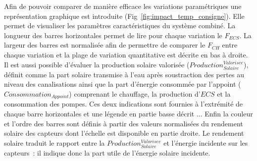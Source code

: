 Afin de pouvoir comparer de manière efficace les variations paramétriques une
représentation graphique est introduite (Fig~\ref{fig:impact_temp_consigne}). Elle permet
de visualiser les paramètres caractéristiques du système combiné. La longueur des barres
horizontales permet de lire pour chaque variation le $F_{ECS}$. La largeur des barres est
normalisée afin de permettre de comparer le $F_{CH}$ entre chaque variation et la plage de
variation quantitative est décrite en bas à droite. Il est aussi possible d’évaluer la
production solaire valorisée ($Production_{Solaire}^{Valorisee}$), définit comme la part
solaire transmise à l’eau après soustraction des pertes au niveau des canalisations ainsi
que la part d’énergie consommée par l’appoint ($Consommation_{Appoint}$) comprenant le
chauffage, la production d’$ECS$ et la consommation des pompes. Ces deux indications sont
fournies à l’extrémité de chaque barre horizontales et une légende en partie basse décrit
... Enfin la couleur et l’ordre des barres sont définis à partir des valeurs normalisées
du rendement solaire des capteurs dont l’échelle est disponible en partie droite. Le
rendement solaire traduit le rapport entre la $Production_{Solaire}^{Valorisee}$ et
l’énergie incidente sur les capteurs~: il indique donc la part utile de l’énergie solaire
incidente.

